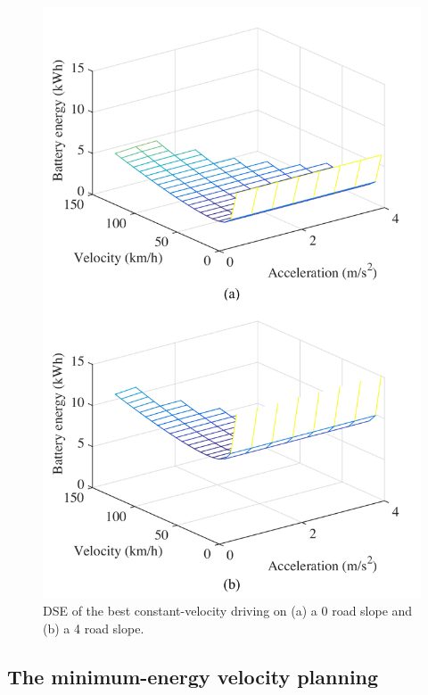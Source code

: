 \documentclass{IEEEtran}
\begin{document}
\begin{figure} %
\centering
\includegraphics[width=0.95\hsize]{Figures/Design_space_exploration.pdf}
\caption{DSE of the best constant-velocity driving on (a) a 0 road slope and (b) a 4 road slope.}
\label{fig:DSE}
\end{figure} 

\subsection{The minimum-energy velocity planning} \label{subsec:variable drive}
\end{document}
